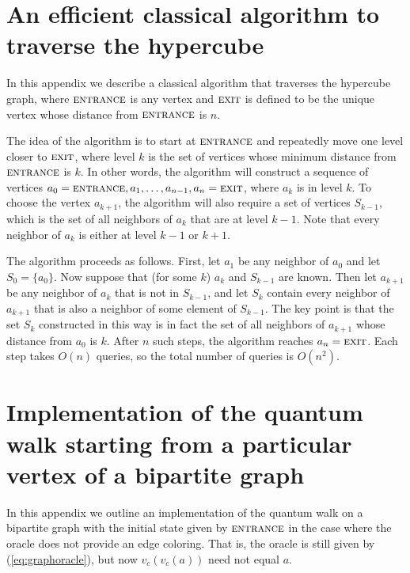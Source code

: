 \documentclass[aps,11pt,twoside,nofootinbib,tightenlines,superscriptaddress,preprintnumbers]{revtex4}
\newcommand{\<}{\langle}
\renewcommand{\>}{\rangle}
\newcommand{\ent}{{\textsc{entrance}}}
\newcommand{\exit}{{\textsc{exit}}}
\begin{document}
\appendix
\section{An efficient classical algorithm to traverse the hypercube}
\label{app:hypercube}

In this appendix we describe a classical algorithm that traverses the
hypercube graph, where $\ent$ is any vertex and $\exit$ is defined to be
the unique vertex whose distance from $\ent$ is $n$.

The idea of the algorithm is to start at $\ent$ and repeatedly move one
level closer to $\exit$, where level $k$ is the set of vertices whose
minimum distance from $\ent$ is $k$.  In other words, the algorithm will
construct a sequence of vertices $a_0=\ent, a_1, \ldots, a_{n-1},
a_n=\exit$, where $a_k$ is in level $k$.  To choose the vertex $a_{k+1}$,
the algorithm will also require a set of vertices $S_{k-1}$, which is the
set of all neighbors of $a_k$ that are at level $k-1$.  Note that every
neighbor of $a_k$ is either at level $k-1$ or $k+1$.

The algorithm proceeds as follows.  First, let $a_1$ be any neighbor of
$a_0$ and let $S_0=\{a_0\}$.  Now suppose that (for some $k$) $a_k$ and
$S_{k-1}$ are known.  Then let $a_{k+1}$ be any neighbor of $a_k$ that is
not in $S_{k-1}$, and let $S_k$ contain every neighbor of $a_{k+1}$ that
is also a neighbor of some element of $S_{k-1}$.  The key point is that
the set $S_k$ constructed in this way is in fact the set of all neighbors
of $a_{k+1}$ whose distance from $a_0$ is $k$.  After $n$ such steps, the
algorithm reaches $a_n=\exit$.  Each step takes $O(n)$ queries, so the
total number of queries is $O(n^2)$.

\section{Implementation of the quantum walk starting from a particular
vertex of a bipartite graph}
\label{app:bipartite}
 
In this appendix we outline an implementation of the quantum walk on a
bipartite graph with the initial state given by $\ent$ in the case where
the oracle does not provide an edge coloring. That is, the oracle is still
given by (\ref{eq:graphoracle}), but now $v_c(v_c(a))$ need not equal $a$.
\end{document}
